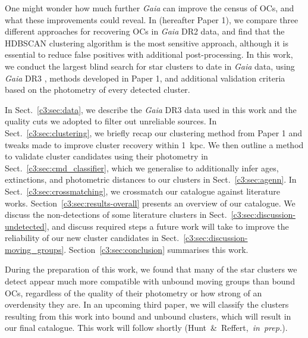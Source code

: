 One might wonder how much further \emph{Gaia} can improve the census of OCs, and what these improvements could reveal. In \cite{hunt_improving_2021} (hereafter Paper 1), we compare three different approaches for recovering OCs in \emph{Gaia} DR2 data, and find that the HDBSCAN clustering algorithm \citep[Hierarchical Density-Based Spatial Clustering of Applications with Noise,][]{hutchison_hdbscan_2013} is the most sensitive approach, although it is essential to reduce false positives with additional post-processing. In this work, we conduct the largest blind search for star clusters to date in \emph{Gaia} data, using \emph{Gaia} DR3 \citep{gaia_collaboration_gaia_2021}, methods developed in Paper 1, and additional validation criteria based on the photometry of every detected cluster. 

In Sect.~\ref{c3:sec:data}, we describe the \emph{Gaia} DR3 data used in this work and the quality cuts we adopted to filter out unreliable sources. In Sect.~\ref{c3:sec:clustering}, we briefly recap our clustering method from Paper 1 and tweaks made to improve cluster recovery within 1~kpc. We then outline a method to validate cluster candidates using their photometry in Sect.~\ref{c3:sec:cmd_classifier}, which we generalise to additionally infer ages, extinctions, and photometric distances to our clusters in Sect.~\ref{c3:sec:agenn}. In Sect.~\ref{c3:sec:crossmatching}, we crossmatch our catalogue against literature works. Section~\ref{c3:sec:results-overall} presents an overview of our catalogue. We discuss the non-detections of some literature clusters in Sect.~\ref{c3:sec:discussion-undetected}, and discuss required steps a future work will take to improve the reliability of our new cluster candidates in Sect.~\ref{c3:sec:discussion-moving_groups}. Section~\ref{c3:sec:conclusion} summarises this work. 

During the preparation of this work, we found that many of the star clusters we detect appear much more compatible with unbound moving groups than bound OCs, regardless of the quality of their photometry or how strong of an overdensity they are. In an upcoming third paper, we will classify the clusters resulting from this work into bound and unbound clusters, which will result in our final catalogue. This work will follow shortly (Hunt~\&~Reffert,~\emph{in~prep.}).




